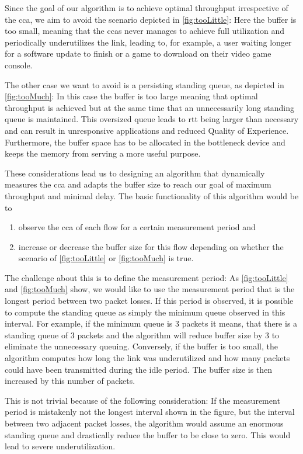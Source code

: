 \documentclass[sigconf, 10pt, letterpaper,dvipsnames\ifx\removeHeaders\tempYes ,nonacm\fi]{acmart}
\begin{document}
Since the goal of our algorithm is to achieve optimal throughput irrespective of the \gls{cca}, we aim to avoid the scenario depicted in \autoref{fig:tooLittle}: Here the buffer is too small, meaning that the \glspl{cca} never manages to achieve full utilization and periodically underutilizes the link, leading to, for example, a user waiting longer for a software update to finish or a game to download on their video game console. 

The other case we want to avoid is a persisting standing queue, as depicted in \autoref{fig:tooMuch}: In this case the buffer is too large meaning that optimal throughput is achieved but at the same time that an unnecessarily long standing queue is maintained. This oversized queue leads to \gls{rtt} being larger than necessary and can result in unresponsive applications and reduced Quality of Experience. Furthermore, the buffer space has to be allocated in the bottleneck device and keeps the memory from serving a more useful purpose. 

These considerations lead us to designing an algorithm that dynamically measures the \gls{cca} and adapts the buffer size to reach our goal of maximum throughput and minimal delay. The basic functionality of this algorithm would be to
\begin{enumerate}[topsep=0pt,wide,labelwidth=!,labelindent=0pt]
\item observe the \gls{cca} of each flow for a certain measurement period and
\item increase or decrease the buffer size for this flow depending on whether the scenario of \autoref{fig:tooLittle} or \autoref{fig:tooMuch} is true. 
\end{enumerate}
The challenge about this is to define the measurement period: As \autoref{fig:tooLittle} and \autoref{fig:tooMuch} show, we would like to use the measurement period that is the longest period between two packet losses. If this period is observed, it is possible to compute the standing queue as simply the minimum queue observed in this interval. For example, if the minimum queue is 3 packets it means, that there is a standing queue of 3 packets and the algorithm will reduce buffer size by 3 to eliminate the unnecessary queuing. Conversely, if the buffer is too small, the algorithm computes how long the link was underutilized and how many packets could have been transmitted during the idle period. The buffer size is then increased by this number of packets. 

This is not trivial because of the following consideration: If the measurement period is mistakenly not the longest interval shown in the figure, but the interval between two adjacent packet losses, the algorithm would assume an enormous standing queue and drastically reduce the buffer to be close to zero. This would lead to severe underutilization. 
\end{document}
